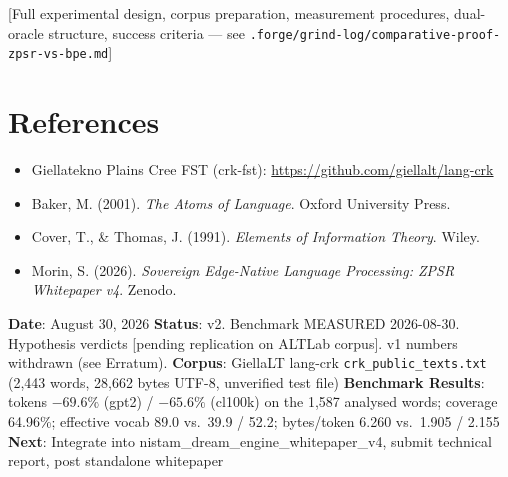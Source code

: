 \documentclass[11pt,oneside]{article}
\begin{document}
[Full experimental design, corpus preparation, measurement procedures, dual-oracle structure, success criteria --- see \texttt{.forge/grind-log/comparative-proof-zpsr-vs-bpe.md}]

\section*{References}

\begin{itemize}
  \item Giellatekno Plains Cree FST (crk-fst): \url{https://github.com/giellalt/lang-crk}
  \item Baker, M. (2001). \emph{The Atoms of Language}. Oxford University Press.
  \item Cover, T., \& Thomas, J. (1991). \emph{Elements of Information Theory}. Wiley.
  \item Morin, S. (2026). \emph{Sovereign Edge-Native Language Processing: ZPSR Whitepaper v4}. Zenodo.
\end{itemize}

\bigskip
\noindent
\textbf{Date}: August 30, 2026
\textbf{Status}: v2. Benchmark MEASURED 2026-08-30. Hypothesis verdicts [pending replication on ALTLab corpus]. v1 numbers withdrawn (see Erratum).
\textbf{Corpus}: GiellaLT lang-crk \texttt{crk\_public\_texts.txt} (2,443 words, 28,662 bytes UTF-8, unverified test file)
\textbf{Benchmark Results}: tokens $-69.6\%$ (gpt2) / $-65.6\%$ (cl100k) on the 1,587 analysed words; coverage 64.96\%; effective vocab 89.0 vs.\ 39.9 / 52.2; bytes/token 6.260 vs.\ 1.905 / 2.155
\textbf{Next}: Integrate into nistam\_dream\_engine\_whitepaper\_v4, submit technical report, post standalone whitepaper
\end{document}
